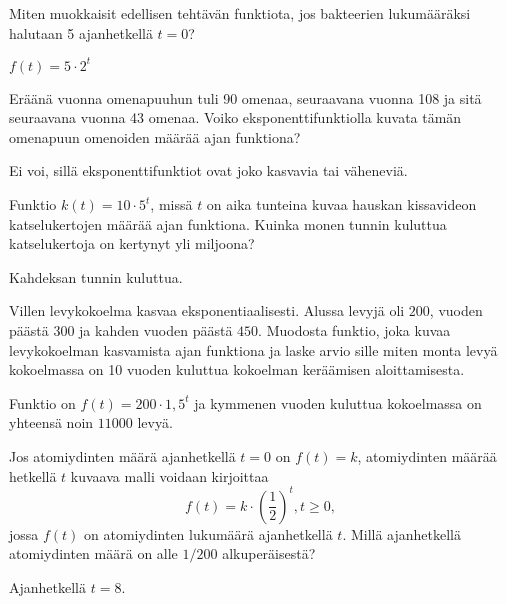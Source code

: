 \begin{tehtavasivu}
\begin{tehtava}
Miten muokkaisit edellisen tehtävän funktiota, jos bakteerien lukumääräksi
halutaan 5 ajanhetkellä $t = 0$?
\begin{vastaus}
$f(t) = 5 \cdot 2^t$
\end{vastaus}
\end{tehtava}

\begin{tehtava}
Eräänä vuonna omenapuuhun tuli 90 omenaa, seuraavana vuonna 108 ja sitä seuraavana vuonna 43 omenaa. Voiko eksponenttifunktiolla kuvata tämän omenapuun omenoiden määrää ajan funktiona?
\begin{vastaus}
Ei voi, sillä eksponenttifunktiot ovat joko kasvavia tai väheneviä.
\end{vastaus}
\end{tehtava}

\begin{tehtava}
Funktio $k(t) = 10 \cdot 5^t$, missä $t$ on aika tunteina kuvaa hauskan kissavideon katselukertojen määrää ajan funktiona. Kuinka monen tunnin kuluttua katselukertoja on kertynyt yli miljoona?
\begin{vastaus}
Kahdeksan tunnin kuluttua.
\end{vastaus}
\end{tehtava}

\begin{tehtava}
Villen levykokoelma kasvaa eksponentiaalisesti. Alussa levyjä oli $ 200 $, vuoden päästä $ 300 $ ja kahden vuoden päästä $ 450 $. Muodosta funktio, joka kuvaa levykokoelman kasvamista ajan funktiona ja laske arvio sille miten monta levyä kokoelmassa on 10 vuoden kuluttua kokoelman keräämisen aloittamisesta.
\begin{vastaus}
Funktio on $f(t) = 200 \cdot 1,5^t$ ja kymmenen vuoden kuluttua kokoelmassa on yhteensä noin $11000$ levyä.
\end{vastaus}
\end{tehtava}

\begin{tehtava}
Jos atomiydinten määrä ajanhetkellä
$t = 0$ on $f(t) = k$, atomiydinten määrää hetkellä $ t $ kuvaava 
malli voidaan kirjoittaa
\[
f(t) = k \cdot \left( \frac{1}{2} \right)^t, t \ge 0,
\]
jossa $f(t)$ on atomiydinten lukumäärä ajanhetkellä $t$.
Millä ajanhetkellä atomiydinten määrä on alle $1/200$ alkuperäisestä?
\begin{vastaus}
Ajanhetkellä $t = 8$.
\end{vastaus}
\end{tehtava}


\end{tehtavasivu}
